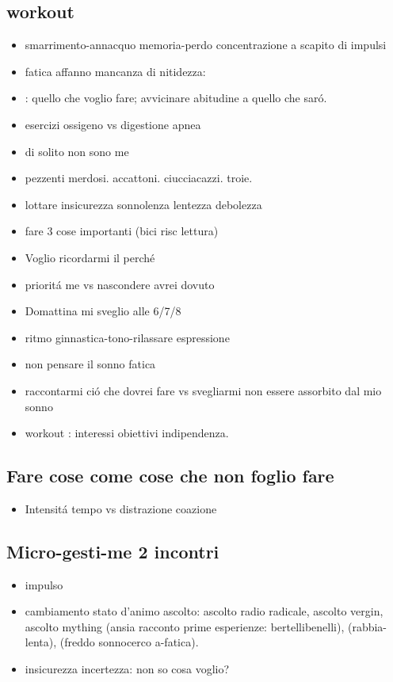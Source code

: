 \subsection{workout}

\begin{itemize}
\item smarrimento-annacquo memoria-perdo concentrazione a scapito di impulsi
\item fatica affanno mancanza di nitidezza: 
\item {}: quello che voglio fare; avvicinare abitudine a quello che sar\'o.
\item esercizi ossigeno vs digestione apnea
\item di solito non sono me
\item pezzenti merdosi. accattoni. ciucciacazzi. troie.
\item lottare insicurezza sonnolenza lentezza debolezza
\item fare 3 cose importanti (bici risc lettura)
\item Voglio ricordarmi il perch\'e
\item priorit\'a me vs nascondere avrei dovuto
\item Domattina mi sveglio alle 6/7/8
\item ritmo ginnastica-tono-rilassare espressione
\item non pensare il sonno fatica
\item raccontarmi ci\'o che dovrei fare vs svegliarmi non essere assorbito dal mio sonno
\item workout : interessi obiettivi indipendenza.
\end{itemize}

\subsection{Fare cose come cose che non foglio fare}

\begin{itemize}
\item Intensit\'a tempo vs distrazione coazione
\end{itemize}

\subsection{Micro-gesti-me 2 incontri}

\begin{itemize}
\item impulso 
\item cambiamento stato d'animo ascolto: ascolto radio radicale, ascolto vergin, ascolto mything (ansia racconto prime esperienze: bertellibenelli), (rabbia-lenta), (freddo sonnocerco a-fatica).
\item {} insicurezza incertezza: non so cosa voglio?
\end{itemize}


